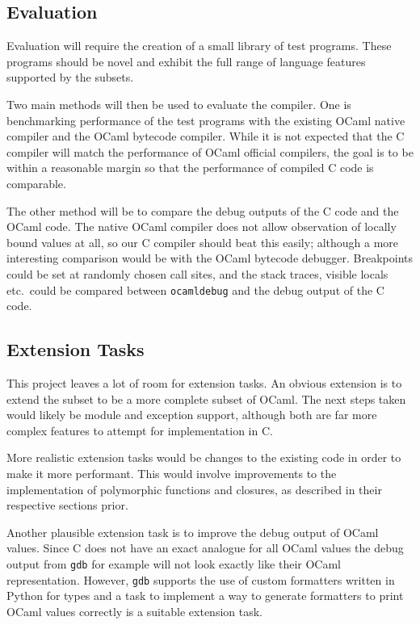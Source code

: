 \subsection*{Evaluation}

Evaluation will require the creation of a small library of test programs. These
programs should be novel and exhibit the full range of language features
supported by the subsets.

Two main methods will then be used to evaluate the compiler. One is
benchmarking performance of the test programs with the existing OCaml native
compiler and the OCaml bytecode compiler. While it is not expected that the C
compiler will match the performance of OCaml official compilers, the goal is to
be within a reasonable margin so that the performance of compiled C code is
comparable.

The other method will be to compare the debug outputs of the C code and the
OCaml code. The native OCaml compiler does not allow observation of locally
bound values at all, so our C compiler should beat this easily; although a more
interesting comparison would be with the OCaml bytecode debugger. Breakpoints
could be set at randomly chosen call sites, and the stack traces, visible
locals etc.\ could be compared between \texttt{ocamldebug} and the debug output
of the C code.

\subsection*{Extension Tasks}

This project leaves a lot of room for extension tasks. An obvious extension is
to extend the subset to be a more complete subset of OCaml. The next steps
taken would likely be module and exception support, although both are far more
complex features to attempt for implementation in C.

More realistic extension tasks would be changes to the existing code in order
to make it more performant. This would involve improvements to the
implementation of polymorphic functions and closures, as described in their
respective sections prior.

Another plausible extension task is to improve the debug output of OCaml
values. Since C does not have an exact analogue for all OCaml values the debug
output from \texttt{gdb} for example will not look exactly like their OCaml
representation. However, \texttt{gdb} supports the use of custom formatters
written in Python for types and a task to implement a way to generate
formatters to print OCaml values correctly is a suitable extension task.

